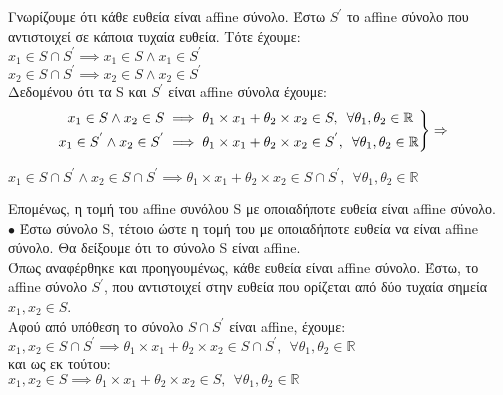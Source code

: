 \documentclass[12pt]{article}
\newcommand{\R}{\mathbb{R}}
\newcommand{\margin}{\hspace{5pt}}
\newenvironment{rcases}
    {\left.\begin{aligned}}
    {\end{aligned}\right\rbrace}
\begin{document}
Γνωρίζουμε ότι κάθε ευθεία είναι affine σύνολο.
Έστω $S^{'}$ το affine σύνολο που αντιστοιχεί σε κάποια τυχαία ευθεία.
Τότε έχουμε:\\

$x_1 \in S \cap S^{'} \implies x_1 \in S \wedge x_1 \in S^{'}$\\
$x_2 \in S \cap S^{'} \implies x_2 \in S \wedge x_2 \in S^{'}$\\

Δεδομένου ότι τα S και $S^{'}$ είναι affine σύνολα έχουμε:\\

\begin{align*}
    &\begin{rcases}
        x_1 \in S \wedge x_2 \in S & \implies \theta_1 \times x_1 + \theta_2 \times x_2 \in S, \margin \forall \theta_1, \theta_2 \in \R\\
        x_1 \in S^{'} \wedge x_2 \in S^{'} & \implies \theta_1 \times x_1 + \theta_2 \times x_2 \in S^{'}, \margin \forall \theta_1, \theta_2 \in \R
    \end{rcases}
    \Rightarrow
\end{align*}

$x_1 \in S \cap S^{'} \wedge x_2 \in S \cap S^{'} \implies \theta_1 \times x_1 + \theta_2 \times x_2 \in S \cap S^{'}, \margin \forall \theta_1, \theta_2 \in \R$

Επομένως, η τομή του affine συνόλου S με οποιαδήποτε ευθεία είναι affine σύνολο.\\

$\bullet$ Έστω σύνολο S, τέτοιο ώστε η τομή του με οποιαδήποτε ευθεία να είναι affine σύνολο.
Θα δείξουμε ότι το σύνολο S είναι affine.\\

Όπως αναφέρθηκε και προηγουμένως, κάθε ευθεία είναι affine σύνολο.
Έστω, το affine σύνολο $S^{'}$, που αντιστοιχεί στην ευθεία 
που ορίζεται από δύο τυχαία σημεία $x_1, x_2 \in S$.\\

Αφού από υπόθεση το σύνολο $S \cap S^{'}$ είναι affine, έχουμε:\\

$x_1, x_2 \in S \cap S^{'} \implies  \theta_1 \times x_1 + \theta_2 \times x_2 \in S \cap S^{'}, \margin \forall \theta_1, \theta_2 \in \R$\\

και ως εκ τούτου:\\

$x_1, x_2 \in S \implies  \theta_1 \times x_1 + \theta_2 \times x_2 \in S, \margin \forall \theta_1, \theta_2 \in \R$\\
\end{document}
